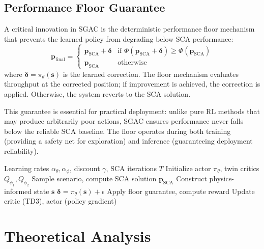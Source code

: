 \documentclass[journal]{IEEEtran}
\begin{document}
\subsection{Performance Floor Guarantee}

A critical innovation in SGAC is the deterministic performance floor mechanism that prevents the learned policy from degrading below SCA performance:
\begin{equation}
\mathbf{p}_{\text{final}} = \begin{cases}
\mathbf{p}_{\text{SCA}} + \boldsymbol{\delta} & \text{if } \Phi(\mathbf{p}_{\text{SCA}} + \boldsymbol{\delta}) \geq \Phi(\mathbf{p}_{\text{SCA}}) \\
\mathbf{p}_{\text{SCA}} & \text{otherwise}
\end{cases}
\label{eq:floor}
\end{equation}
where $\boldsymbol{\delta} = \pi_\theta(\mathbf{s})$ is the learned correction. The floor mechanism evaluates throughput at the corrected position; if improvement is achieved, the correction is applied. Otherwise, the system reverts to the SCA solution.

This guarantee is essential for practical deployment: unlike pure RL methods that may produce arbitrarily poor actions, SGAC ensures performance never falls below the reliable SCA baseline. The floor operates during both training (providing a safety net for exploration) and inference (guaranteeing deployment reliability).

\begin{algorithm}[t]
\caption{SGAC Training Algorithm}
\label{alg:sgac}
\begin{algorithmic}[1]
\REQUIRE Learning rates $\alpha_\theta, \alpha_\phi$, discount $\gamma$, SCA iterations $T$
\STATE Initialize actor $\pi_\theta$, twin critics $Q_{\phi_1}, Q_{\phi_2}$
    \STATE Sample scenario, compute SCA solution $\mathbf{p}_{\text{SCA}}$
    \STATE Construct physics-informed state $\mathbf{s}$
        \STATE $\boldsymbol{\delta} = \pi_\theta(\mathbf{s}) + \epsilon$
        \STATE Apply floor guarantee, compute reward
        \STATE Update critic (TD3), actor (policy gradient)
    \ENDFOR
\ENDFOR
\end{algorithmic}
\end{algorithm}

\section{Theoretical Analysis}
\end{document}
